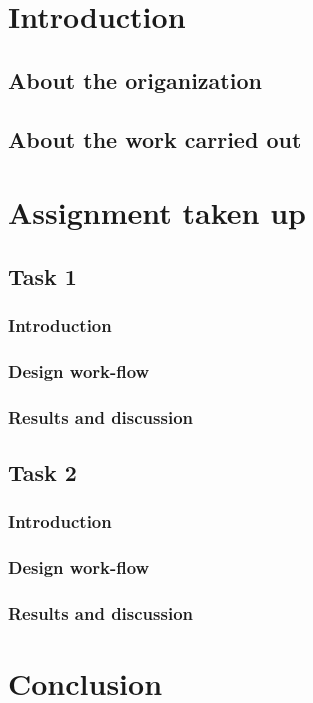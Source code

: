 \documentclass[12pt]{article}
\begin{document}


\newpage
\tableofcontents
\newpage
\listoftables
\newpage
\listoffigures
\newpage
\section{Introduction}
\lipsum[2-4]
\subsection{About the origanization}
\lipsum[2-4]
\subsection{About the work carried out}
\lipsum[2-4]
\section{Assignment taken up}
\lipsum[2-4]
\subsection{Task 1}
\subsubsection{Introduction}
\lipsum[2-4]
\subsubsection{Design work-flow}
\lipsum[2-4]
\subsubsection{Results and discussion}
\lipsum[2-4]
\subsection{Task 2}
\subsubsection{Introduction}
\lipsum[2-4]
\subsubsection{Design work-flow}
\lipsum[2-4]
\subsubsection{Results and discussion}
\lipsum[2-4]
\section{Conclusion}
\end{document}
